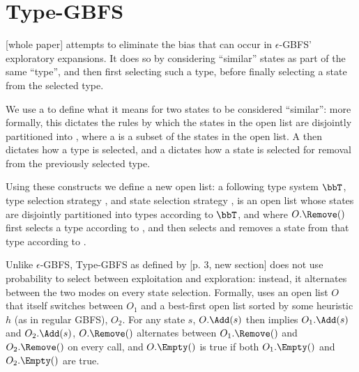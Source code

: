 
\section{Type-GBFS}

 [whole paper] attempts to eliminate the bias that can occur in $\epsilon$-GBFS' exploratory expansions. It does so by considering ``similar'' states as part of the same ``type'', and then first selecting such a type, before finally selecting a state from the selected type.

We use a  to define what it means for two states to be considered ``similar'': more formally, this dictates the rules by which the states in the open list are disjointly partitioned into , where a  is a subset of the states in the open list. A  then dictates how a type is selected, and a  dictates how a state is selected for removal from the previously selected type.

Using these constructs we define a new open list: a  following type system $\bbT$, type selection strategy , and state selection strategy , is an open list whose states are disjointly partitioned into types according to $\bbT$, and where $O.\Remove()$ first selects a type according to , and then selects and removes a state from that type according to .

Unlike $\epsilon$-GBFS, Type-GBFS as defined by [p. 3, new section] does not use probability to select between exploitation and exploration: instead, it alternates between the two modes on every state selection. Formally,  uses an open list $O$ that itself switches between $O_1$ and a best-first open list sorted by some heuristic $h$ (as in regular GBFS), $O_2$. For any state $s$, $O.\Add(s)$ then implies $O_1.\Add(s)$ and $O_2.\Add(s)$, $O.\Remove()$ alternates between $O_1.\Remove()$ and $O_2.\Remove()$ on every call, and $O.\Empty()$ is true if both $O_1.\Empty()$ and $O_2.\Empty()$ are true.


